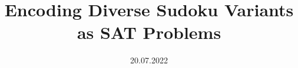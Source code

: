 \documentclass[a4paper, 10pt, oneside]{memoir}
\title				{Encoding Diverse Sudoku Variants as SAT Problems}
\date				{20.07.2022}
\begin{document}

\thesisfront
\maketitle
\pagestyle{thesis}


\thesistoc
\thesismain






%
\thesisappendix
\thesisbib
\begin{appendices}
	 
\end{appendices}
\thesisback
{}
  {}
  {}
\end{document}

